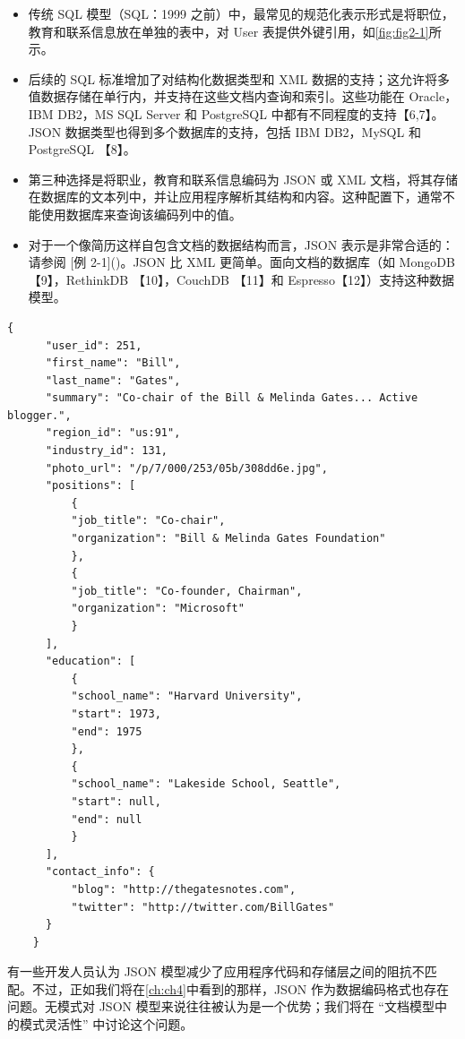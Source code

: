 \begin{itemize}
    \item 传统 SQL 模型（SQL：1999 之前）中，最常见的规范化表示形式是将职位，教育和联系信息放在单独的表中，对 User 表提供外键引用，如\autoref{fig:fig2-1}所示。
    \item 后续的 SQL 标准增加了对结构化数据类型和 XML 数据的支持；这允许将多值数据存储在单行内，并支持在这些文档内查询和索引。这些功能在 Oracle，IBM DB2，MS SQL Server 和 PostgreSQL 中都有不同程度的支持【6,7】。JSON 数据类型也得到多个数据库的支持，包括 IBM DB2，MySQL 和 PostgreSQL 【8】。
    \item 第三种选择是将职业，教育和联系信息编码为 JSON 或 XML 文档，将其存储在数据库的文本列中，并让应用程序解析其结构和内容。这种配置下，通常不能使用数据库来查询该编码列中的值。
    \item 对于一个像简历这样自包含文档的数据结构而言，JSON 表示是非常合适的：请参阅 [例 2-1]()。JSON 比 XML 更简单。面向文档的数据库（如 MongoDB 【9】，RethinkDB 【10】，CouchDB 【11】和 Espresso【12】）支持这种数据模型。
\end{itemize}

\begin{lstlisting}[caption={用 JSON 文档表示一个 LinkedIn 简介}, breaklines]
    {
      "user_id": 251,
      "first_name": "Bill",
      "last_name": "Gates",
      "summary": "Co-chair of the Bill & Melinda Gates... Active blogger.",
      "region_id": "us:91",
      "industry_id": 131,
      "photo_url": "/p/7/000/253/05b/308dd6e.jpg",
      "positions": [
          {
          "job_title": "Co-chair",
          "organization": "Bill & Melinda Gates Foundation"
          },
          {
          "job_title": "Co-founder, Chairman",
          "organization": "Microsoft"
          }
      ],
      "education": [
          {
          "school_name": "Harvard University",
          "start": 1973,
          "end": 1975
          },
          {
          "school_name": "Lakeside School, Seattle",
          "start": null,
          "end": null
          }
      ],
      "contact_info": {
          "blog": "http://thegatesnotes.com",
          "twitter": "http://twitter.com/BillGates"
      }
    }
\end{lstlisting}

有一些开发人员认为 JSON 模型减少了应用程序代码和存储层之间的阻抗不匹配。不过，正如我们将在\autoref{ch:ch4}中看到的那样，JSON 作为数据编码格式也存在问题。无模式对 JSON 模型来说往往被认为是一个优势；我们将在 “文档模型中的模式灵活性” 中讨论这个问题。

